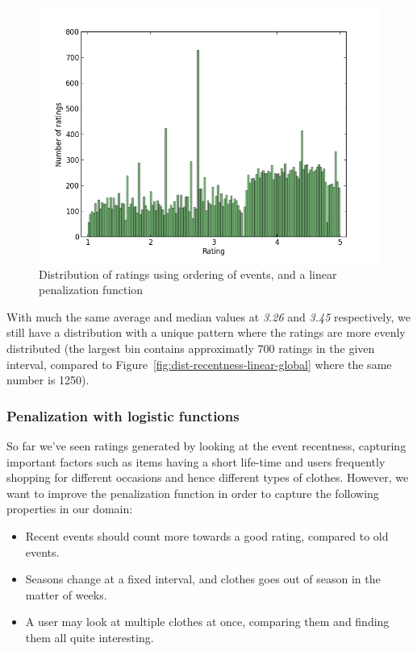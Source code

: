 \begin{figure}[H]
  \centering
  \includegraphics[scale=0.6]{image/dist-count-linear}
  \caption{Distribution of ratings using ordering of events, and a linear
 penalization function}
  \label{fig:dist-count-linear}
\end{figure}

With much the same average and median values at \textit{3.26} and \textit{3.45}
respectively, we still have a distribution with a unique pattern where the
ratings are more evenly distributed (the largest bin contains approximatly 700
ratings in the given interval, compared to
Figure~\ref{fig:dist-recentness-linear-global} where the same number is 1250).

\subsubsection{Penalization with logistic functions}

So far we've seen ratings generated by looking at the event recentness,
capturing important factors such as items having a short life-time and users
frequently shopping for different occasions and hence different types of
clothes. However, we want to improve the penalization function in order to
capture the following properties in our domain:

\begin{itemize}
  \item Recent events should count more towards a good rating, compared to old
  events.
  \item Seasons change at a fixed interval, and clothes goes out of season in
  the matter of weeks.
  \item A user may look at multiple clothes at once, comparing them and finding
  them all quite interesting.
\end{itemize}

